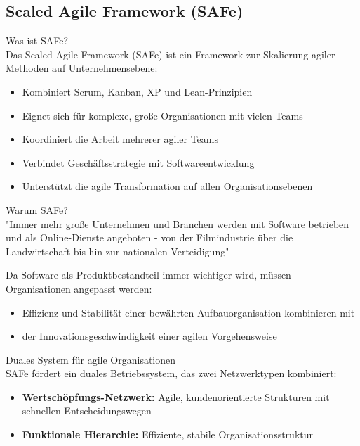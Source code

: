 \subsection{Scaled Agile Framework (SAFe)}

\begin{definition}{Was ist SAFe?}\\
    Das Scaled Agile Framework (SAFe) ist ein Framework zur Skalierung agiler Methoden auf Unternehmensebene:
    \begin{itemize}
        \item Kombiniert Scrum, Kanban, XP und Lean-Prinzipien
        \item Eignet sich für komplexe, große Organisationen mit vielen Teams
        \item Koordiniert die Arbeit mehrerer agiler Teams
        \item Verbindet Geschäftsstrategie mit Softwareentwicklung
        \item Unterstützt die agile Transformation auf allen Organisationsebenen
    \end{itemize}
\end{definition}

\begin{concept}{Warum SAFe?}\\
    "Immer mehr große Unternehmen und Branchen werden mit Software betrieben und als Online-Dienste angeboten - von der Filmindustrie über die Landwirtschaft bis hin zur nationalen Verteidigung"
    
    Da Software als Produktbestandteil immer wichtiger wird, müssen Organisationen angepasst werden:
    \begin{itemize}
        \item Effizienz und Stabilität einer bewährten Aufbauorganisation kombinieren mit
        \item der Innovationsgeschwindigkeit einer agilen Vorgehensweise
    \end{itemize}
\end{concept}

\begin{concept}{Duales System für agile Organisationen}\\
    SAFe fördert ein duales Betriebssystem, das zwei Netzwerktypen kombiniert:
    \begin{itemize}
        \item \textbf{Wertschöpfungs-Netzwerk:} Agile, kundenorientierte Strukturen mit schnellen Entscheidungswegen
        \item \textbf{Funktionale Hierarchie:} Effiziente, stabile Organisationsstruktur
    \end{itemize}
\end{concept}

